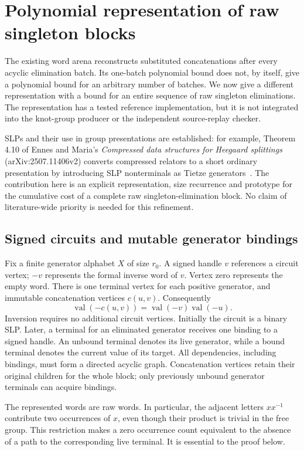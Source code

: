 \section{Polynomial representation of raw singleton blocks}
\label{sec:persistent-elimination}

The existing word arena reconstructs substituted concatenations after every
acyclic elimination batch. Its one-batch polynomial bound does not, by
itself, give a polynomial bound for an arbitrary number of batches. We now
give a different representation with a bound for an entire sequence of raw
singleton eliminations. The representation has a tested reference
implementation, but it is not integrated into the knot-group producer or
the independent source-replay checker.

SLPs and their use in group presentations are established: for example,
Theorem 4.10 of Ennes and Maria's \emph{Compressed data structures for
Heegaard splittings} (arXiv:2507.11406v2) converts compressed relators to
a short ordinary presentation by introducing SLP nonterminals as Tietze
generators~\cite{ennesmaria2025}. The contribution here is an explicit representation, size
recurrence and prototype for the cumulative cost of a complete raw
singleton-elimination block. No claim of literature-wide priority is
needed for this refinement.

\subsection{Signed circuits and mutable generator bindings}

Fix a finite generator alphabet $X$ of size $r_0$. A signed handle $v$
references a circuit vertex; $-v$ represents the formal inverse word of
$v$. Vertex zero represents the empty word. There is one terminal vertex
for each positive generator, and immutable concatenation vertices
$c(u,v)$. Consequently
\[
 \operatorname{val}(-c(u,v))
 =\operatorname{val}(-v)\operatorname{val}(-u).
\]
Inversion requires no additional circuit vertices. Initially the circuit
is a binary SLP. Later, a terminal for an eliminated generator receives
one binding to a signed handle. An unbound terminal denotes its live
generator, while a bound terminal denotes the current value of its target.
All dependencies, including bindings, must form a directed acyclic graph.
Concatenation vertices retain their original children for the whole block;
only previously unbound generator terminals can acquire bindings.

The represented words are raw words. In particular, the adjacent letters
$x x^{-1}$ contribute two occurrences of $x$, even though their product
is trivial in the free group. This restriction makes a zero occurrence
count equivalent to the absence of a path to the corresponding live
terminal. It is essential to the proof below.

